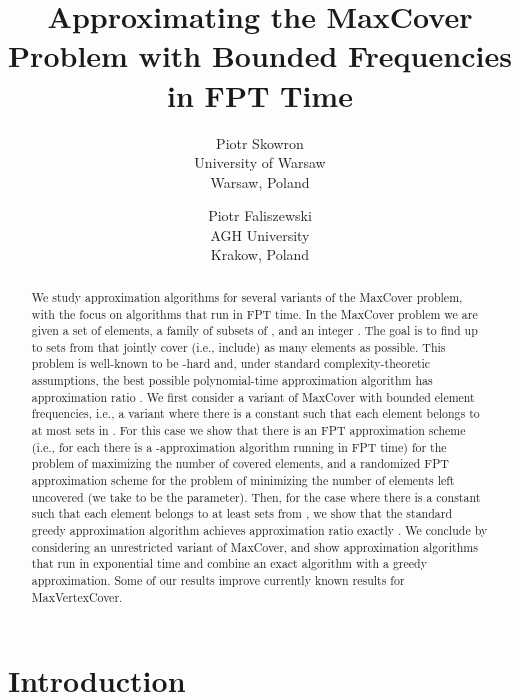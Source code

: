 \documentclass[11pt]{article}
\title{Approximating the MaxCover Problem with Bounded Frequencies in
  FPT Time}
\author{Piotr Skowron\\ 
        University of Warsaw\\
        Warsaw, Poland\\
        \and
        Piotr Faliszewski\\
        AGH University\\
        Krakow, Poland
}
\begin{document}
\maketitle


\begin{abstract}
  We study approximation algorithms for several variants of the
  MaxCover problem, with the focus on algorithms that run in FPT time.
  In the MaxCover problem we are given a set  of elements, a family
   of subsets of , and an integer . The goal is to find
  up to  sets from  that jointly cover (i.e., include) as
  many elements as possible. This problem is well-known to be
  -hard and, under standard complexity-theoretic assumptions, the
  best possible polynomial-time approximation algorithm has
  approximation ratio .  We first consider a variant
  of MaxCover with bounded element frequencies, i.e., a variant where
  there is a constant  such that each element belongs to at most
   sets in .  For this case we show that there is an FPT
  approximation scheme (i.e., for each  there is a -approximation
  algorithm running in FPT time) for the problem of maximizing the number of
  covered elements, and a randomized FPT approximation scheme for the
  problem of minimizing the number of elements left uncovered (we take
   to be the parameter). Then, for the case where there is a
  constant  such that each element belongs to at least  sets
  from , we show that the standard greedy approximation
  algorithm achieves approximation ratio exactly
  . We conclude by considering an unrestricted
  variant of MaxCover, and show approximation algorithms that run in
  exponential time and combine an exact algorithm with a greedy
  approximation. Some of our results improve currently known results for
  MaxVertexCover.
\end{abstract}


\section{Introduction}
\end{document}

